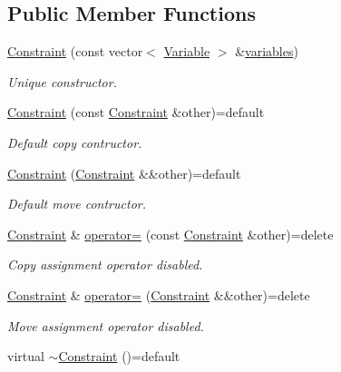 \subsection*{Public Member Functions}
\begin{DoxyCompactItemize}
\item 
\hyperlink{classghost_1_1Constraint_a005ea04b17e7f02a3424f7b01196f172}{Constraint} (const vector$<$ \hyperlink{classghost_1_1Variable}{Variable} $>$ \&\hyperlink{classghost_1_1Constraint_aabd62a463f0004e9e79227d380cf0020}{variables})
\begin{DoxyCompactList}\small\item\em Unique constructor. \end{DoxyCompactList}\item 
\hyperlink{classghost_1_1Constraint_a12f4e85434d02d6fe0a2a95fa7ff6a56}{Constraint} (const \hyperlink{classghost_1_1Constraint}{Constraint} \&other)=default
\begin{DoxyCompactList}\small\item\em Default copy contructor. \end{DoxyCompactList}\item 
\hyperlink{classghost_1_1Constraint_af90f09c362cb7eea3f92ed2814f26f20}{Constraint} (\hyperlink{classghost_1_1Constraint}{Constraint} \&\&other)=default
\begin{DoxyCompactList}\small\item\em Default move contructor. \end{DoxyCompactList}\item 
\hyperlink{classghost_1_1Constraint}{Constraint} \& \hyperlink{classghost_1_1Constraint_a002177e11deecee2db240c9ff4647008}{operator=} (const \hyperlink{classghost_1_1Constraint}{Constraint} \&other)=delete
\begin{DoxyCompactList}\small\item\em Copy assignment operator disabled. \end{DoxyCompactList}\item 
\hyperlink{classghost_1_1Constraint}{Constraint} \& \hyperlink{classghost_1_1Constraint_a2d220b6c65e9c5456bdbc49944a0b52c}{operator=} (\hyperlink{classghost_1_1Constraint}{Constraint} \&\&other)=delete
\begin{DoxyCompactList}\small\item\em Move assignment operator disabled. \end{DoxyCompactList}\item 
virtual \hyperlink{classghost_1_1Constraint_aebea8263c24d0c3a5328c20ee0006f32}{$\sim$\+Constraint} ()=default

\end{DoxyCompactItemize}
